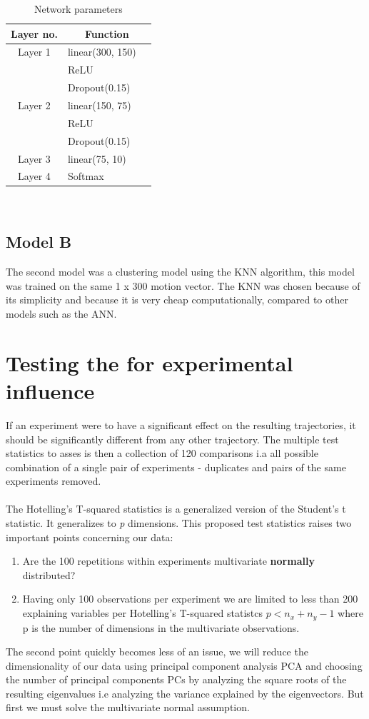 \documentclass{article}
\begin{document}
\begin{table}[H]
\centering
\begin{tabular}[H]{c l @{} l}
\centering
Layer no.       &
\multicolumn{2}{c}{Function} \\
\hline
Layer 1     & linear(300, 150) \\
            & ReLU \\
            & Dropout(0.15) \\
Layer 2     & linear(150, 75) \\ 
            & ReLU \\
            & Dropout(0.15) \\
Layer 3     & linear(75, 10) \\ 
Layer 4     & Softmax\\ 
\end{tabular}\\
\caption{Network parameters}
\label{tab:ann} 
\end{table}

\subsection{Model B}
The second model was a clustering model using the KNN algorithm, this model was trained on the same 1 x 300 motion vector.
The KNN was chosen because of its simplicity and because it is very cheap computationally, compared to other models such as the ANN.

\section{Testing the for experimental influence}


If an experiment were to have a significant effect on the resulting trajectories, it should be significantly different from any other trajectory. The multiple test statistics to asses is then a collection of 120 comparisons i.a all possible combination of a single pair of experiments - duplicates and pairs of the same experiments removed.\\ \\
The Hotelling's T-squared statistics is a generalized version of the Student's t statistic. It generalizes to \textit{p} dimensions. 
This proposed test statistics raises two important points concerning our data:
\begin{enumerate}
	\item  Are the 100 repetitions within experiments multivariate \textbf{normally} distributed?
	\item Having only 100 observations per experiment we are limited to less than 200 explaining variables per Hotelling's T-squared statistcs $p < n_x + n_y -1$ where p is the number of dimensions in the multivariate observations.
\end{enumerate}
The second point quickly becomes less of an issue, we will reduce the dimensionality of our data using principal component analysis PCA and choosing the number of principal components PCs by analyzing the square roots of the resulting eigenvalues i.e analyzing the variance explained by the eigenvectors. But first we must solve the multivariate normal assumption. \\
\end{document}
